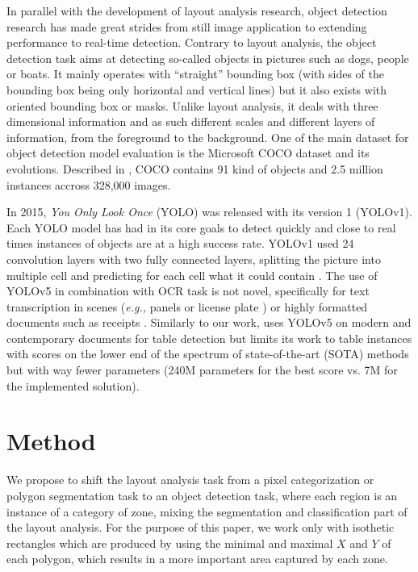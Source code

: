 \documentclass{jdmdh}
\begin{document}
In parallel with the development of layout analysis research, object detection research has made great strides from still image application to extending performance to real-time detection. Contrary to layout analysis, the object detection task aims at detecting so-called objects in pictures such as dogs, people or boats. It mainly operates with ``straight'' bounding box (with sides of the bounding box being only horizontal and vertical lines) but it also exists with oriented bounding box or masks. Unlike layout analysis, it deals with three dimensional information and as such different scales and different layers of information, from the foreground to the background. One of the main dataset for object detection model evaluation is the Microsoft COCO dataset and its evolutions. Described in \citet{lin2014microsoft}, COCO contains 91 kind of objects and 2.5 million instances accross 328,000 images.

In 2015, \textit{You Only Look Once} (YOLO) was released with its version 1 (YOLOv1). Each YOLO model has had in its core goals to detect quickly and close to real times instances of objects are at a high success rate. YOLOv1 used 24 convolution layers with two fully connected layers, splitting the picture into multiple cell and predicting for each cell what it could contain \citep{jiang2022a}. The use of YOLOv5 \citep{jocher2022ultralytics} in combination with OCR task is not novel, specifically for text transcription in scenes (\textit{e.g., }panels or license plate \citep{raj2022license}) or highly formatted documents such as receipts \citep{lin2022automatic}. Similarly to our work, \citet{ning2021mt} uses YOLOv5 on modern and contemporary documents for table detection but limits its work to table instances with scores on the lower end of the spectrum of state-of-the-art (SOTA) methods but with way fewer parameters (240M parameters for the best score vs. 7M for the implemented solution).


\section{Method}

We propose to shift the layout analysis task from a pixel categorization or polygon segmentation task to an object detection task, where each region is an instance of a category of zone, mixing the segmentation and classification part of the layout analysis. For the purpose of this paper, we work only with isothetic rectangles which are produced by using the minimal and maximal $X$ and $Y$ of each polygon, which results in a more important area captured by each zone. 
\end{document}
